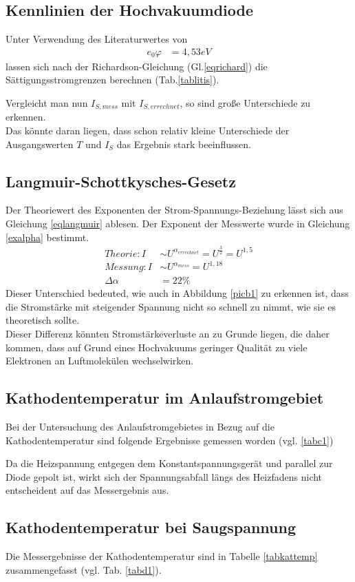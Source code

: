 \subsection{Kennlinien der Hochvakuumdiode}
	Unter Verwendung des Literaturwertes\cite{tafel} von
\begin{align}
	e_0\varphi&=4{,}53eV
 \end{align}
 lassen sich nach der Richardson-Gleichung (Gl.\ref{eqrichard}) die Sättigungsstromgrenzen berechnen (Tab.\ref{tablitis}).
 
 Vergleicht man nun $I_{S,mess}$ mit $I_{S,errechnet}$, so sind große Unterschiede zu erkennen.\\
 Das könnte daran liegen, dass schon relativ kleine Unterschiede der Ausgangswerten $T$ und $I_S$
 das Ergebnis stark beeinflussen.
 \FloatBarrier
\subsection{Langmuir-Schottkysches-Gesetz}
Der Theoriewert des Exponenten der Strom-Spannungs-Beziehung lässt sich aus Gleichung \ref{eqlangmuir} ablesen.
Der Exponent der Messwerte wurde in Gleichung \ref{exalpha} bestimmt.
\begin{align}
Theorie: I&\sim U^{\alpha_{errechnet}}=U^{\frac{3}{2}}=U^{1{,}5} \\
Messung: I&\sim U^{\alpha_{mess}}=U^{1{,}18} \\
\Delta \alpha &=22\%
\end{align}
Dieser Unterschied bedeuted, wie auch in Abbildung \ref{picb1} zu erkennen ist, dass die Stromstärke
mit steigender Spannung nicht so schnell zu nimmt, wie sie es theoretisch sollte. \\
Dieser Differenz könnten Stromstärkeverluste an zu Grunde liegen, die daher kommen, dass auf Grund eines
Hochvakuums geringer Qualität zu viele Elektronen an Luftmolekülen wechselwirken.
\subsection{Kathodentemperatur im Anlaufstromgebiet}
Bei der Untersuchung des Anlaufstromgebietes in Bezug auf die Kathodentemperatur sind folgende Ergebnisse
gemessen worden (vgl. \ref{tabc1})

Da die Heizspannung entgegen dem Konstantspannungsgerät und parallel zur Diode gepolt ist, wirkt sich der Spannungsabfall längs des
Heizfadens nicht entscheident auf das Messergebnis aus.
\FloatBarrier
\subsection{Kathodentemperatur bei Saugspannung}
Die Messergebnisse der Kathodentemperatur sind in Tabelle \ref{tabkattemp} zusammengefasst (vgl. Tab. \ref{tabd1}).

\FloatBarrier
